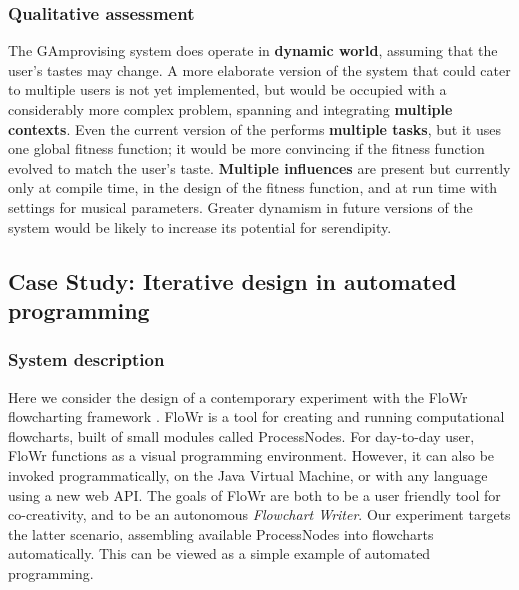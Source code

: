 \subsubsection{Qualitative assessment}

The {\sf GAmprovising} system does operate in \textbf{dynamic world},
assuming that the user's tastes may change.  A more elaborate version
of the system that could cater to multiple users is not yet
implemented, but would be occupied with a considerably more complex
problem, spanning and integrating \textbf{multiple contexts}.  Even
the current version of the performs \textbf{multiple tasks}, but it
uses one global fitness function; it would be more convincing if the
fitness function evolved to match the user's taste.  \textbf{Multiple
  influences} are present but currently only at compile time, in the
design of the fitness function, and at run time with settings for
musical parameters.  Greater dynamism in future versions of the system
would be likely to increase its potential for serendipity.


\subsection{Case Study: Iterative design in automated programming} \label{sec:flowchartassembly}

\subsubsection{System description}

Here we consider the design of a contemporary experiment with the
{\sf FloWr} flowcharting framework \cite{colton-flowcharting}.  
%
{\sf FloWr} is a tool for creating and running computational
flowcharts, built of small modules called ProcessNodes.
%
For day-to-day user, {\sf FloWr} functions as a visual programming
environment.  However, it can also be invoked programmatically, on the
Java Virtual Machine, or with any language using a new web API.  The
goals of {\sf FloWr} are both to be a user friendly tool for
co-creativity, and to be an autonomous \emph{Flowchart Writer}.  Our
experiment targets the latter scenario, assembling available
ProcessNodes into flowcharts automatically.  This can be viewed as a
simple example of automated programming.

